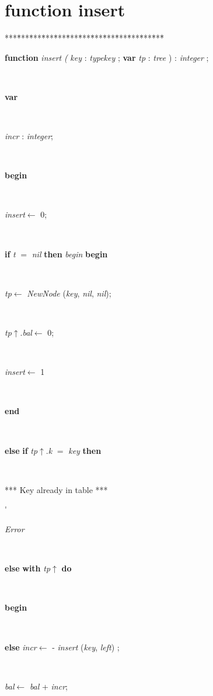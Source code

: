 \documentclass[10pt, a4paper]{article}
\begin{document}
\section{function insert}\label{sec:genericset/pointer2pset/setle/setge/setequals/setdifference/rec/setsymetricdifference/setintersection/rec/setunion/rec/isemptyset/emptyset/newset/find/isin/getlast/getright/getfirst/getleft/getnext/getnextnode/lrot/rrotinsert}

\begin{tabbing}
***\=***\=***\=***\=***\=***\=***\=***\=***\=***\=***\=***\=***\=\kill
\parbox{14cm}{\textsf {\textbf {function } \textsf{ \textit{insert} \textit{(}  \textit{key}  : \textit{typekey} ; } \textbf{ var } \textsf{ \textit{tp}  : \textit{tree}  ) : \textit{integer} ;}}}\\
\+\parbox{14cm}{\textsf{\textbf{var} }}\\
\parbox{14cm}{\textsf{\textit{incr} : \textit{integer}}; }\\
\-\<\+\parbox{14cm}{\textsf{\textbf{begin} }}\\
\parbox{14cm}{\textsf{\textit{insert}$\leftarrow$ 0}; }\\
\+\<\parbox{14cm}{\textsf {\textbf {if } \textsf{\textit{t} $=$ \textit{nil}} \textbf{ then } \textsf{\textit{begin}} \textbf{ begin } }}\\
\parbox{14cm}{\textsf{\textit{tp}$\leftarrow$ \textit{NewNode} (\textit{key}, \textit{nil}, \textit{nil})}; }\\
\parbox{14cm}{\textsf{\textit{tp}$\uparrow$.\textit{bal}$\leftarrow$ 0}; }\\
\parbox{14cm}{\textsf{\textit{insert}$\leftarrow$ 1}}\\
\<\-\parbox{14cm}{\textsf{\textbf{end} }}\\
\+\parbox{14cm}{\textsf {\textbf {else }  \textbf{ if } \textsf{\textit{tp}$\uparrow$.\textit{k} $=$ \textit{key}} \textbf{ then } }}\\
\<\<\parbox{3.5cm}{\scriptsize{*** Key already in table ***}}\'\>\>\parbox{14cm}{\textsf{\textit{Error}}}\\
\+\parbox{14cm}{\textsf {\textbf {else }  \textbf{ with } \textsf{\textit{tp}$\uparrow$\textit{}} \textbf{ do } }}\\
\<\parbox{14cm}{\textsf{\textbf{begin} }}\\
\parbox{14cm}{\textsf {\textbf {else } \textsf{\textit{incr}$\leftarrow$  -  \textit{insert} (\textit{key}, \textit{left}) }; }}\\
\parbox{14cm}{\textsf{\textit{bal}$\leftarrow$ \textit{bal} + \textit{incr}}; }\\

\end{tabbing}
\end{document}
